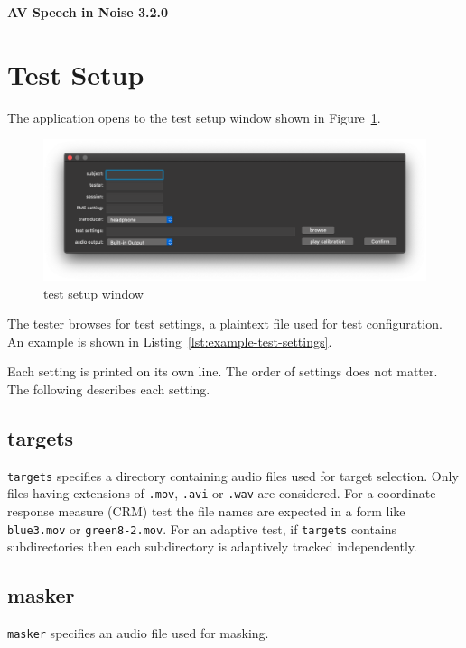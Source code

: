 \documentclass[11pt,pdftex,letterpaper]{article}
\begin{document}
\vspace*{30ex}
\begin{center}
\textbf{AV Speech in Noise 3.2.0}
\end{center}
\pagebreak
\tableofcontents
\pagebreak

\section{Test Setup}
The application opens to the test setup window shown in Figure~\ref{fig:test-setup-window}.
\begin{figure}
	\centering
	\includegraphics[width = 0.9\linewidth]{test-setup-window.png}
	\caption{test setup window}
	\label{fig:test-setup-window}
\end{figure}
The tester browses for test settings, a plaintext file used for test configuration. An example is shown in Listing~\ref{lst:example-test-settings}.

\noindent\begin{minipage}{\textwidth}
	
\end{minipage}
Each setting is printed on its own line. The order of settings does not matter. The following describes each setting.
\subsection{targets}
\texttt{targets} specifies a directory containing audio files used for target selection. Only files having extensions of \texttt{.mov}, \texttt{.avi} or \texttt{.wav} are considered. For a coordinate response measure (CRM) test the file names are expected in a form like \texttt{blue3.mov} or \texttt{green8-2.mov}. For an adaptive test, if \texttt{targets} contains subdirectories then each subdirectory is adaptively tracked independently.
\subsection{masker}
\texttt{masker} specifies an audio file used for masking.
\end{document}

